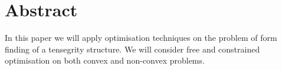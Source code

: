 \section{Abstract}
In this paper we will apply optimisation techniques on the problem of form finding of a tensegrity structure. We will consider free and constrained optimisation on both convex and non-convex problems.